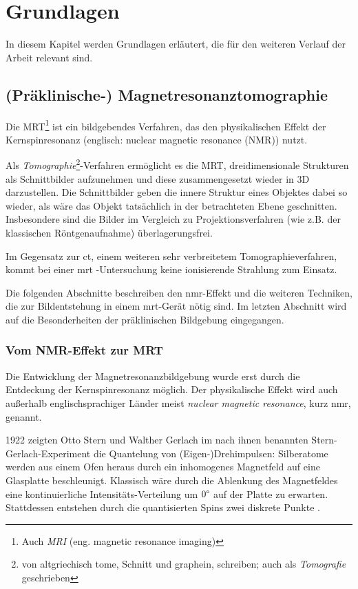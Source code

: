 \chapter{Grundlagen}
In diesem Kapitel werden Grundlagen erläutert, die für den weiteren Verlauf der Arbeit relevant sind.

\section{(Präklinische-) Magnetresonanztomographie}
Die MRT\footnote{Auch \textit{MRI} (eng. magnetic resonance imaging)} ist ein bildgebendes Verfahren, das den physikalischen Effekt der Kernspinresonanz (englisch: nuclear magnetic resonance (NMR)) nutzt.

Als \textit{Tomographie}\footnote{von altgriechisch tome, Schnitt und graphein, schreiben; auch als \textit{Tomografie} geschrieben}-Verfahren ermöglicht es die MRT, dreidimensionale Strukturen als Schnittbilder aufzunehmen und diese zusammengesetzt wieder in 3D darzustellen. Die Schnittbilder geben die innere Struktur eines Objektes dabei so wieder, als wäre das Objekt tatsächlich in der betrachteten Ebene geschnitten. Insbesondere sind die Bilder im Vergleich zu Projektionsverfahren (wie z.B. der klassischen Röntgenaufnahme) über\-lagerungs\-frei.

Im Gegensatz zur \gls{ct}, einem weiteren sehr verbreitetem Tomographieverfahren, kommt bei einer \gls{mrt} -Untersuchung keine ionisierende Strahlung zum Einsatz.

Die folgenden Abschnitte beschreiben den \gls{nmr}-Effekt und die weiteren Techniken, die zur Bildentstehung in einem \gls{mrt}-Gerät nötig sind. Im letzten Abschnitt wird auf die Besonderheiten der präklinischen Bildgebung eingegangen.

\subsection{Vom NMR-Effekt zur MRT}
Die Entwicklung der Magnetresonanzbildgebung wurde erst durch die Entdeckung der Kernspinresonanz möglich. Der physikalische Effekt wird auch außerhalb englischsprachiger Länder meist \textit{nuclear magnetic resonance}, kurz \gls{nmr}, genannt.

1922 zeigten Otto Stern und Walther Gerlach im nach ihnen benannten Stern-Gerlach-Experiment die Quantelung von (Eigen-)Drehimpulsen: Silberatome werden aus einem Ofen heraus durch ein inhomogenes Magnetfeld auf eine Glasplatte beschleunigt. Klassisch wäre durch die Ablenkung des Magnetfeldes eine kontinuierliche Intensitäts-Verteilung um $0\degree$ auf der Platte zu erwarten. Stattdessen entstehen durch die quantisierten Spins zwei diskrete Punkte \cite{Gerlach1922}.

